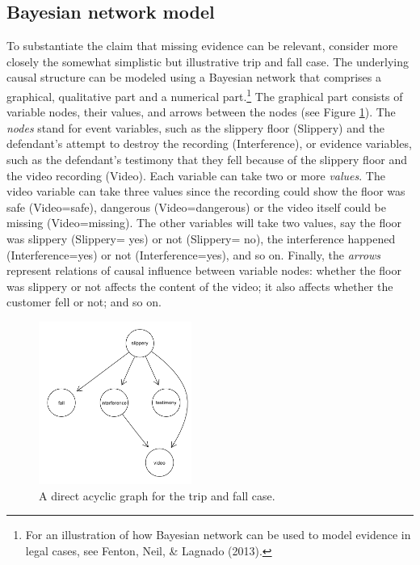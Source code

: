 \documentclass[
  10pt,
  dvipsnames,enabledeprecatedfontcommands]{scrartcl}
\begin{document}
\hypertarget{bayesian-network-model}{%
\subsection{Bayesian network model}\label{bayesian-network-model}}

To substantiate the claim that missing evidence can be relevant,
consider more closely the somewhat simplistic but illustrative trip and
fall case. The underlying causal structure can be modeled using a
Bayesian network that comprises a graphical, qualitative part and a
numerical part.\footnote{For an illustration of how Bayesian network can
  be used to model evidence in legal cases, see Fenton, Neil, \& Lagnado
  (2013).} The graphical part consists of variable nodes, their values,
and arrows between the nodes (see Figure \ref{fig:dag-missing-video}).
The \textit{nodes} stand for event variables, such as the slippery floor
(\textsf{Slippery}) and the defendant's attempt to destroy the recording
(\textsf{Interference}), or evidence variables, such as the defendant's
testimony that they fell because of the slippery floor and the video
recording (\textsf{Video}). Each variable can take two or more
\textit{values}. The video variable can take three values since the
recording could show the floor was safe (\textsf{Video}=\textsf{safe}),
dangerous (\textsf{Video}=\textsf{dangerous}) or the video itself could
be missing (\textsf{Video}=\textsf{missing}). The other variables will
take two values, say the floor was slippery (\textsf{Slippery}=
\textsf{yes}) or not (\textsf{Slippery}= \textsf{no}), the interference
happened (\textsf{Interference}=\textsf{yes}) or not
(\textsf{Interference}=\textsf{yes}), and so on. Finally, the
\textit{arrows} represent relations of causal influence between variable
nodes: whether the floor was slippery or not affects the content of the
video; it also affects whether the customer fell or not; and so on.

\begin{figure}[t]
\includegraphics[width=5cm]{slippery-dag.png}
\caption{A direct acyclic graph for the trip and fall case.}
\label{fig:dag-missing-video}
\end{figure}
\end{document}
